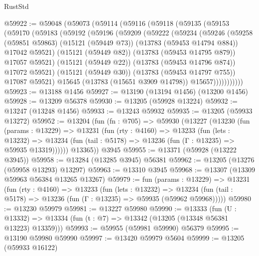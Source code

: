 \begin{lexlean}{RustStd}
\begin{coremodule}
@59922 := @59048
    (@59073
      (@59114
        (@59116
          (@59118
            (@59135
              (@59153
                (@59170
                  (@59183
                    (@59192
                      (@59196
                        (@59209
                          (@59222
                            (@59234
                              (@59246
                                (@59258
                                  (@59851 @59863)
                                  (@15121 (@59449 @73))
                                  (@13783 (@59453 @14794 @884))
                                  @17042
                                  @59521)
                                (@15121 (@59449 @82))
                                (@13783 (@59453 @14795 @879))
                                @17057
                                @59521)
                              (@15121 (@59449 @22))
                              (@13783 (@59453 @14796 @874))
                              @17072
                              @59521)
                            (@15121 (@59449 @30))
                            (@13783 (@59453 @14797 @755))
                            @17087
                            @59521)
                          @15645
                          (@13783 (@15651 @3909 @14798))
                          @15657)))))))))))
@59923 := @13188 @1456
@59927 := @13190 (@13194 @1456) (@13200 @1456)
@59928 := @13209 @56378
@59930 := @13205 (@59928 @13224)
@59932 := @13247 (@13248 @1456)
@59933 := @13243 @59932
@59935 := @13205 (@59933 @13272)
@59952 := @13204
    (fun (fn : @705) =>
    @59930
      (@13227
        (@13230
          (fun (params : @13229) =>
          @13231
            (fun (rty : @4160) =>
            @13233
              (fun (lets : @13232) =>
              @13234 (fun (tail : @5178) => @13236 (fun (Γ : @13235) => @59935 @13319))))))
        @13365))
    @3945
@59955 := @13371 (@59928 (@13222 @3945))
@59958 := @13284 (@13285 @3945) @56381
@59962 := @13205 (@13276 (@59958 @13293) @13297)
@59963 := @13310 @3945
@59968 := @13307 (@13309 @59963 @56384 @13265 @13267)
@59979 := fun (params : @13229) =>
  @13231
    (fun (rty : @4160) =>
    @13233
      (fun (lets : @13232) =>
      @13234 (fun (tail : @5178) => @13236 (fun (Γ : @13235) => @59935 (@59962 @59968)))))
@59980 := @13230 @59979
@59981 := @13227 @59980
@59990 := @13333
    (fun (U : @13332) => @13334 (fun (t : @7) => @13342 (@13205 (@13348 @56381 @13223) @13359)))
@59993 := @59955 (@59981 @59990) @56379
@59995 := @13190 @59980 @59990
@59997 := @13420 @59979 @5604
@59999 := @13205 (@59933 @16122)

\end{coremodule}
\end{lexlean}
